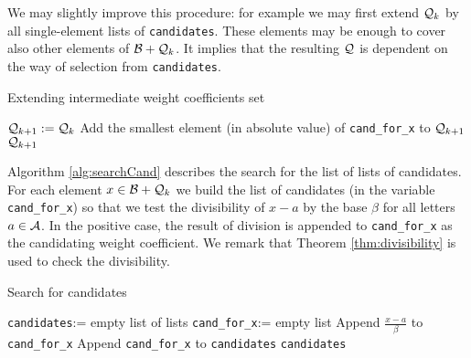 We may slightly improve this procedure: for example we may first extend $\mathcal{Q}_{k}$ by all single-element lists of \verb+candidates+. These elements may be enough to cover also other elements of $\mathcal{B}+\mathcal{Q}_{k}$. It implies that the resulting $\mathcal{Q}$ is dependent on the way of selection from \verb+candidates+.

\begin{algorithm}
  \caption{Extending intermediate weight coefficients set}
    \label{alg:extendWeightCoefSet}
  \begin{algorithmic}[1]
    \STATE $\mathcal{Q}_{k+1}:=\mathcal{Q}_{k}$
            \STATE Add the smallest element (in absolute value) of  \verb+cand_for_x+ to $\mathcal{Q}_{k+1}$  
        \ENDIF
    \ENDFOR
    \RETURN $\mathcal{Q}_{k+1}$
  \end{algorithmic}
\end{algorithm}

Algorithm \ref{alg:searchCand} describes the search for the list of lists of candidates. For each element $x\in \mathcal{B} + \mathcal{Q}_{k}$ we build the list of candidates (in the variable \verb+cand_for_x+) so that we test the divisibility of $x-a$ by the base $\beta$ for all letters $a\in\mathcal{A}$. In the positive case, the result of division is appended to \verb+cand_for_x+ as the candidating weight coefficient. We remark that Theorem \ref{thm:divisibility} is used to check the divisibility.


\begin{algorithm}
  \caption{Search for candidates}
    \label{alg:searchCand}
  \begin{algorithmic}[1]
    \STATE \verb+candidates+:= empty list of lists
     \label{line:replaceBySmaller}
      \STATE \verb+cand_for_x+:= empty list
              \STATE Append $\frac{x-a}{\beta}$ to \verb+cand_for_x+
            \ENDIF
      \ENDFOR 
      \STATE Append \verb+cand_for_x+ to \verb+candidates+
  \ENDFOR
  \RETURN \verb+candidates+
  \end{algorithmic}
\end{algorithm}  

